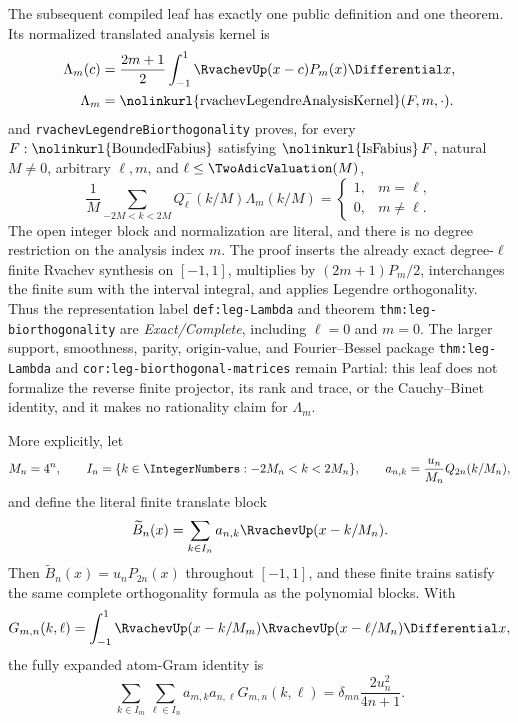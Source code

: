 \documentclass[11pt,oneside]{article}
\theoremstyle{definition}
\theoremstyle{remark}
\newcommand{\lean}[1]{%
  \ifmmode\text{\nolinkurl{#1}}\else\nolinkurl{#1}\fi}
\begin{document}
The subsequent compiled leaf
 has exactly one public definition
and one theorem.  Its normalized translated analysis kernel is
\begin{equation}
 \begin{aligned}
 \Lambda_m(c)&=\frac{2m+1}{2}\int_{-1}^{1}
 \RvachevUp(x-c)P_m(x)\Differential x,\\
 \Lambda_m&=\lean{rvachevLegendreAnalysisKernel}(F,m,\cdot).
 \end{aligned}                                                   \label{eq:rvachev-legendre-analysis-kernel}
\end{equation}
and \lean{rvachevLegendreBiorthogonality} proves, for every
\(F:\lean{BoundedFabius}\) satisfying \(\lean{IsFabius}\,F\), natural
\(M\ne0\), arbitrary \(\ell,m\), and
\(\ell\le\TwoAdicValuation(M)\),
\begin{equation}
 \frac1M\sum_{-2M<k<2M}Q_\ell^-(k/M)\Lambda_m(k/M)
 =\begin{cases}1,&m=\ell,\\0,&m\ne\ell.\end{cases}             \label{eq:rvachev-legendre-biorthogonality}
\end{equation}
The open integer block and normalization are literal, and there is no degree
restriction on the analysis index \(m\).  The proof inserts the already exact
degree-\(\ell\) finite Rvachev synthesis on \([-1,1]\), multiplies by
\((2m+1)P_m/2\), interchanges the finite sum with the interval integral, and
applies Legendre orthogonality.  Thus the representation label
\nolinkurl{def:leg-Lambda} and theorem
\nolinkurl{thm:leg-biorthogonality} are \emph{Exact/Complete}, including
\(\ell=0\) and \(m=0\).  The larger support, smoothness, parity, origin-value,
and Fourier--Bessel package \nolinkurl{thm:leg-Lambda} and
\nolinkurl{cor:leg-biorthogonal-matrices} remain Partial: this leaf does not
formalize the reverse finite projector, its rank and trace, or the
Cauchy--Binet identity, and it makes no rationality claim for \(\Lambda_m\).

More explicitly, let
\[
 M_n=4^n,\qquad I_n=\{k\in\IntegerNumbers:-2M_n<k<2M_n\},\qquad
 a_{n,k}=\frac{u_n}{M_n}Q_{2n}(k/M_n),
\]
and define the literal finite translate block
\begin{equation}
 \widetilde B_n(x)=\sum_{k\in I_n}a_{n,k}\RvachevUp(x-k/M_n).
 \label{eq:legendre-translate-block}
\end{equation}
Then \(\widetilde B_n(x)=u_nP_{2n}(x)\) throughout \([-1,1]\), and these
finite trains satisfy the same complete orthogonality formula as the polynomial
blocks.  With
\[
 G_{m,n}(k,\ell)=\int_{-1}^{1}
 \RvachevUp(x-k/M_m)\RvachevUp(x-\ell/M_n)\Differential x,
\]
the fully expanded atom-Gram identity is
\begin{equation}
 \sum_{k\in I_m}\sum_{\ell\in I_n}a_{m,k}a_{n,\ell}G_{m,n}(k,\ell)
 =\delta_{mn}\frac{2u_n^2}{4n+1}.                         \label{eq:legendre-atom-gram}
\end{equation}
\end{document}
